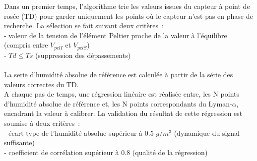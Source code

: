 Dans un premier temps, l'algorithme trie les valeurs issues du
capteur \`a point de ros\'ee (TD) pour garder
uniquement les points o\`u le capteur n'est pas en phase de recherche.
La s\'election se fait suivant
deux crit\`eres~:\\
\indent - valeur de la tension de l'\'el\'ement Peltier proche de
la valeur \`a l'\'equilibre (compris entre $V_{pelI}$ et $V_{pelS}$)\\
\indent - $Td \leq Ts$ (suppression des d\'epassements)\\
\\
La serie d'humidit\'e absolue de r\'ef\'erence est calcul\'ee \`a partir
de la s\'erie des valeurs correctes du TD.\\
A chaque pas de temps,
une r\'egression lin\'eaire est r\'ealis\'ee entre, les
N points d'humidit\'e absolue de r\'ef\'erence et, les N points
correspondants
du Lyman-$\alpha$, encadrant la valeur \`a calibrer.
La validation du r\'esultat de cette r\'egression est soumise \`a
deux crit\`eres~:\\
\indent - \'ecart-type de l'humidit\'e absolue sup\'erieur \`a 0.5 $g/m^3$
(dynamique du signal suffisante)\\
\indent - coefficient de corr\'elation sup\'erieur \`a 0.8 (qualit\'e de
la r\'egression)\\


